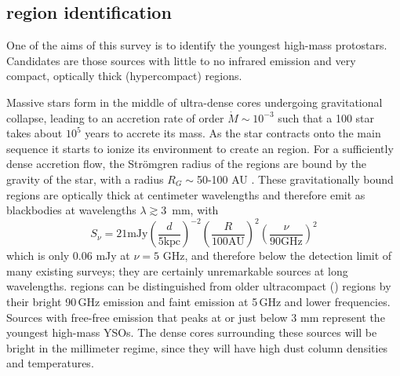 \documentclass[twocolumn]{aastex62}
\begin{document}


\subsection{\hchii region identification}
\label{sec:hiireg}
One of the aims of this survey is to identify the youngest high-mass
protostars.  Candidates are those sources with little to no infrared emission
and very compact, optically thick (hypercompact) \hii regions.

Massive stars form in the middle of ultra-dense cores undergoing gravitational
collapse, leading to an accretion rate of order $\dot{M} \sim 10^{-3}$ \msun
\peryr such that a 100 \msun star takes about $10^5$ years to accrete its mass.
As the star contracts onto the main sequence it starts to ionize its
environment to create an \hchii region.  For a sufficiently dense accretion
flow, the Str{\"o}mgren radius of the \hchii regions are bound by the gravity of
the star, with a radius $R_G \sim$50-100 AU
\citep{Keto2002a,Keto2003a,Keto2007a}.  These gravitationally bound \hchii
regions are optically thick at centimeter wavelengths and therefore emit as
blackbodies at wavelengths $\lambda\gtrsim$3~mm, with 
\begin{equation}
    S_\nu=21 \textrm{mJy} \left(\frac{d}{5
    \textrm{kpc}}\right)^{-2} \left(\frac{R}{100 \textrm{AU}}\right)^2 \left(\frac{\nu}{90 \textrm{GHz}}\right)^2
\end{equation}
which is only
0.06 mJy at $\nu=5$ GHz, and therefore below the detection limit of many
existing surveys; they are certainly unremarkable sources at long wavelengths.
\hchii regions can be distinguished from older
ultracompact (\uchii) regions by their  bright 90\,GHz emission and faint emission at 5\,GHz and lower
frequencies.  Sources
with free-free emission that peaks at or just below 3 mm represent the youngest
high-mass YSOs.  The dense cores surrounding these sources will be bright
in the millimeter regime, since they will have high dust column densities and
temperatures.
\end{document}

